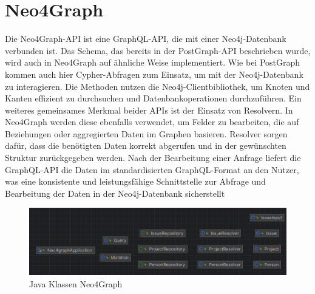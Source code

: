 \section{Neo4Graph} %
\label{sec:neo4graph}
Die Neo4Graph-API ist eine GraphQL-API, die mit einer Neo4j-Datenbank verbunden ist. Das Schema, das bereits in der PostGraph-API beschrieben wurde, wird auch in Neo4Graph auf ähnliche Weise implementiert. Wie bei PostGraph kommen auch hier Cypher-Abfragen zum Einsatz, um mit der Neo4j-Datenbank zu interagieren. Die Methoden nutzen die Neo4j-Clientbibliothek, um Knoten und Kanten effizient zu durchsuchen und Datenbankoperationen durchzuführen.
\noindent
Ein weiteres gemeinsames Merkmal beider APIs ist der Einsatz von Resolvern. In Neo4Graph werden diese ebenfalls verwendet, um Felder zu bearbeiten, die auf Beziehungen oder aggregierten Daten im Graphen basieren. Resolver sorgen dafür, dass die benötigten Daten korrekt abgerufen und in der gewünschten Struktur zurückgegeben werden.
\noindent
Nach der Bearbeitung einer Anfrage liefert die GraphQL-API die Daten im standardisierten GraphQL-Format an den Nutzer, was eine konsistente und leistungsfähige Schnittstelle zur Abfrage und Bearbeitung der Daten in der Neo4j-Datenbank sicherstellt

\begin{figure}[H]
	\centering
	\includegraphics[scale=0.5]{Illustrations/neo4graph.png}
	\caption{Java Klassen Neo4Graph}
\end{figure}


